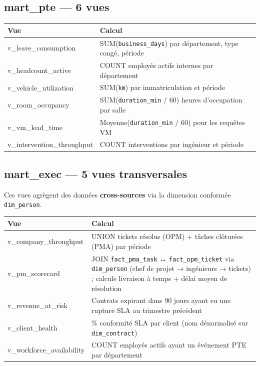 \documentclass[a4paper,12pt]{article}
\begin{document}
\subsection{mart\_pte — 6 vues}

\begin{tabularx}{\textwidth}{>{\ttfamily\footnotesize}p{5cm} >{\footnotesize}X}
\toprule
\textbf{Vue} & \textbf{Calcul} \\
\midrule
v\_leave\_consumption       & SUM(\texttt{business\_days}) par département, type congé, période \\
v\_headcount\_active        & COUNT employés actifs internes par département \\
v\_vehicle\_utilization     & SUM(\texttt{km}) par immatriculation et période \\
v\_room\_occupancy          & SUM(\texttt{duration\_min} / 60) heures d'occupation par salle \\
v\_vm\_lead\_time           & Moyenne(\texttt{duration\_min} / 60) pour les requêtes VM \\
v\_intervention\_throughput & COUNT interventions par ingénieur et période \\
\bottomrule
\end{tabularx}

\subsection{mart\_exec — 5 vues transversales}

Ces vues agrègent des données \textbf{cross-sources} via la dimension conformée
\texttt{dim\_person}.

\begin{tabularx}{\textwidth}{>{\ttfamily\footnotesize}p{5cm} >{\footnotesize}X}
\toprule
\textbf{Vue} & \textbf{Calcul} \\
\midrule
v\_company\_throughput  & UNION tickets résolus (OPM) + tâches clôturées (PMA) par période \\
v\_pm\_scorecard        & JOIN \texttt{fact\_pma\_task} ↔ \texttt{fact\_opm\_ticket} via
                          \texttt{dim\_person} (chef de projet → ingénieurs → tickets) ;
                          calcule livraison à temps + délai moyen de résolution \\
v\_revenue\_at\_risk    & Contrats expirant dans 90 jours ayant eu une rupture SLA
                          au trimestre précédent \\
v\_client\_health       & \% conformité SLA par client (nom dénormalisé sur \texttt{dim\_contract}) \\
v\_workforce\_availability & COUNT employés actifs ayant un événement PTE par département \\
\bottomrule
\end{tabularx}
\end{document}
